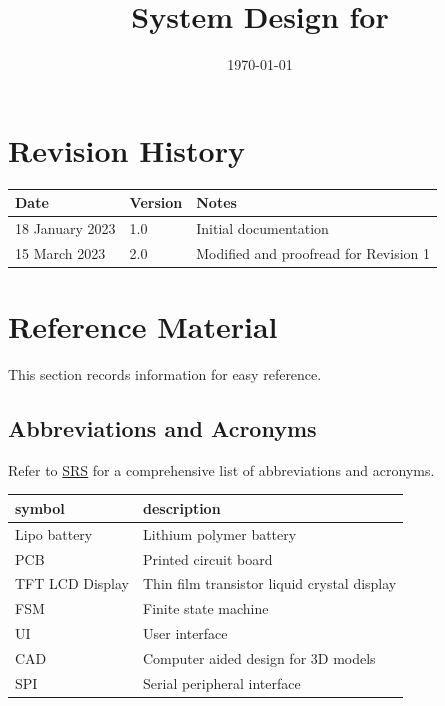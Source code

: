 \documentclass[12pt, titlepage]{article}
\begin{document}
\title{System Design for \progname{}} 
\author{\authname}
\date{\today}

\maketitle


\section{Revision History}

\begin{tabularx}{\textwidth}{p{4cm}p{2cm}X}
\toprule {\bf Date} & {\bf Version} & {\bf Notes}\\
\midrule
18 January 2023 & 1.0 & Initial documentation\\
15 March 2023 & 2.0 & Modified and proofread for Revision 1 \\
\bottomrule
\end{tabularx}

\newpage

\section{Reference Material}

This section records information for easy reference.

\subsection{Abbreviations and Acronyms}
Refer to \href{https://github.com/zakerl/Capstone_Project/blob/main/docs/SRS/SRS.pdf}{SRS} for a comprehensive list of abbreviations and acronyms.\\

\renewcommand{\arraystretch}{1.2}
\begin{tabular}{l l} 
  \toprule		
  \textbf{symbol} & \textbf{description}\\
  \midrule 
	Lipo battery & Lithium polymer battery\\
	PCB & Printed circuit board\\
	TFT LCD Display & Thin film transistor liquid crystal display\\
	FSM & Finite state machine\\
	UI & User interface\\
	CAD & Computer aided design for 3D models\\
	SPI & Serial peripheral interface\\

  \bottomrule
\end{tabular}\\
\end{document}
